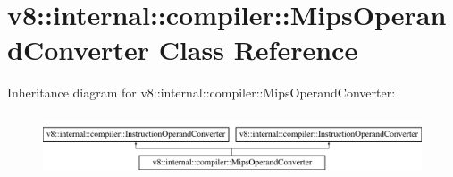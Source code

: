\hypertarget{classv8_1_1internal_1_1compiler_1_1MipsOperandConverter}{}\section{v8\+:\+:internal\+:\+:compiler\+:\+:Mips\+Operand\+Converter Class Reference}
\label{classv8_1_1internal_1_1compiler_1_1MipsOperandConverter}
Inheritance diagram for v8\+:\+:internal\+:\+:compiler\+:\+:Mips\+Operand\+Converter\+:\begin{figure}[H]
\begin{center}
\leavevmode
\includegraphics[height=1.824104cm]{classv8_1_1internal_1_1compiler_1_1MipsOperandConverter}
\end{center}
\end{figure}
